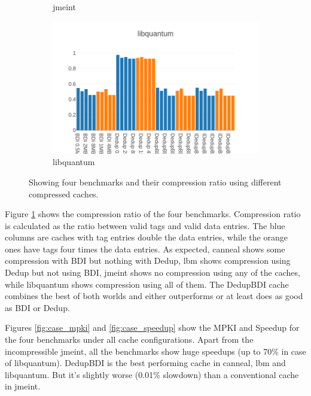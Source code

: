\begin{figure}
\begin{subfigure}{0.5\textwidth}
        \caption{jmeint}
    \end{subfigure}
    \begin{subfigure}{0.5\textwidth}
        \includegraphics[width=\textwidth]{libquantum-compratio.png}
        \caption{libquantum}
    \end{subfigure}
    \caption[Case Study: Compression]{Showing four benchmarks and their compression ratio using different compressed caches.}
    \label{fig:case_compratio}
\end{figure}
Figure \ref{fig:case_compratio} shows the compression ratio of the four benchmarks. Compression ratio is calculated as the ratio between valid tags and valid data entries. The blue columns are caches with tag entries double the data entries, while the orange ones have tags four times the data entries. As expected, canneal shows some compression with BDI but nothing with Dedup, lbm shows compression using Dedup but not using BDI, jmeint shows no compression using any of the caches, while libquantum shows compression using all of them. The DedupBDI cache combines the best of both worlds and either outperforms or at least does as good as BDI or Dedup.\par
Figures \ref{fig:case_mpki} and \ref{fig:case_speedup} show the MPKI and Speedup for the four benchmarks under all cache configurations. Apart from the incompressible jmeint, all the benchmarks show huge speedups (up to 70\% in case of libquantum). DedupBDI is the best performing cache in canneal, lbm and libquantum. But it's slightly worse (0.01\% slowdown) than a conventional cache in jmeint.
